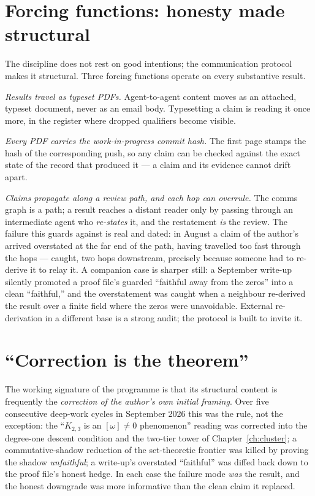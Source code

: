 \documentclass[11pt]{report}
\theoremstyle{plain}
\theoremstyle{definition}
\theoremstyle{remark}
\begin{document}
\section{Forcing functions: honesty made structural}\label{sec:pipeline-forcing}

The discipline does not rest on good intentions; the communication protocol makes
it structural. Three forcing functions operate on every substantive result.

\emph{Results travel as typeset PDFs.} Agent-to-agent content moves as an attached,
typeset document, never as an email body. Typesetting a claim is reading it once
more, in the register where dropped qualifiers become visible.

\emph{Every PDF carries the work-in-progress commit hash.} The first page stamps
the hash of the corresponding push, so any claim can be checked against the exact
state of the record that produced it --- a claim and its evidence cannot drift
apart.

\emph{Claims propagate along a review path, and each hop can overrule.} The comms
graph is a path; a result reaches a distant reader only by passing through an
intermediate agent who \emph{re-states} it, and the restatement \emph{is} the
review. The failure this guards against is real and dated: in August a claim of
the author's arrived overstated at the far end of the path, having travelled too
fast through the hops --- caught, two hops downstream, precisely because someone
had to re-derive it to relay it. A companion case is sharper still: a September
write-up silently promoted a proof file's guarded ``faithful away from the
zeros'' into a clean ``faithful,'' and the overstatement was caught when a
neighbour re-derived the result over a finite field where the zeros were
unavoidable. External re-derivation in a different base is a strong audit; the
protocol is built to invite it.

\section{``Correction is the theorem''}\label{sec:pipeline-correction}

The working signature of the programme is that its structural content is
frequently the \emph{correction of the author's own initial framing}. Over five
consecutive deep-work cycles in September 2026 this was the rule, not the
exception: the ``$K_{2,3}$ is an $[\omega]\neq0$ phenomenon'' reading was corrected
into the degree-one descent condition and the two-tier tower of
Chapter~\ref{ch:cluster}; a commutative-shadow reduction of the set-theoretic
frontier was killed by proving the shadow \emph{unfaithful}; a write-up's
overstated ``faithful'' was diffed back down to the proof file's honest hedge. In
each case the failure mode \emph{was} the result, and the honest downgrade was
more informative than the clean claim it replaced.
\end{document}
